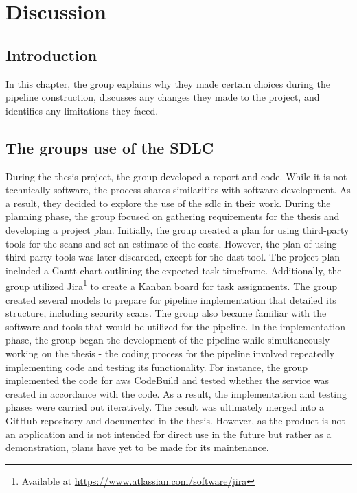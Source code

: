 \chapter{Discussion}
\section{Introduction}
In this chapter, the group explains why they made certain choices during the pipeline construction, discusses any changes they made to the project, and identifies any limitations they faced.


\section{The groups use of the SDLC} %
During the thesis project, the group developed a report and code. While it is not technically software, the process shares similarities with software development. As a result, they decided to explore the use of the \acrshort{sdlc} in their work.
During the planning phase, the group focused on gathering requirements for the thesis and developing a project plan. Initially, the group created a plan for using third-party tools for the scans and set an estimate of the costs. However, the plan of using third-party tools was later discarded, except for the \acrshort{dast} tool. The project plan included a Gantt chart outlining the expected task timeframe. Additionally, the group utilized Jira\footnote{Available at \url{https://www.atlassian.com/software/jira}} to create a Kanban board for task assignments. The group created several models to prepare for pipeline implementation that detailed its structure, including security scans. The group also became familiar with the software and tools that would be utilized for the pipeline.
In the implementation phase, the group began the development of the pipeline while simultaneously working on the thesis - the coding process for the pipeline involved repeatedly implementing code and testing its functionality. For instance, the group implemented the code for \acrshort{aws} CodeBuild and tested whether the service was created in accordance with the code. As a result, the implementation and testing phases were carried out iteratively.
The result was ultimately merged into a GitHub repository and documented in the thesis. However, as the product is not an application and is not intended for direct use in the future but rather as a demonstration, plans have yet to be made for its maintenance. 

